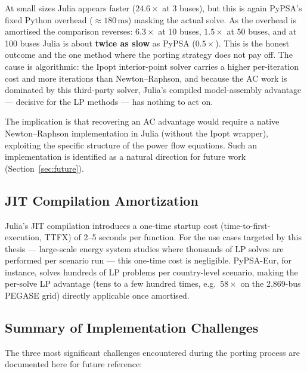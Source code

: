 At small sizes Julia appears faster ($24.6\times$ at 3 buses), but this is again PyPSA's fixed Python overhead ($\approx 180\,\text{ms}$) masking the actual solve. As the overhead is amortised the comparison reverses: $6.3\times$ at 10 buses, $1.5\times$ at 50 buses, and at 100 buses Julia is about \textbf{twice as slow} as PyPSA ($0.5\times$). This is the honest outcome and the one method where the porting strategy does not pay off. The cause is algorithmic: the Ipopt interior-point solver carries a higher per-iteration cost and more iterations than Newton--Raphson, and because the AC work is dominated by this third-party solver, Julia's compiled model-assembly advantage --- decisive for the LP methods --- has nothing to act on.

The implication is that recovering an AC advantage would require a native Newton--Raphson implementation in Julia (without the Ipopt wrapper), exploiting the specific structure of the power flow equations. Such an implementation is identified as a natural direction for future work (Section~\ref{sec:future}).

\subsection{JIT Compilation Amortization}

Julia's JIT compilation introduces a one-time startup cost (time-to-first-execution, TTFX) of 2--5 seconds per function. For the use cases targeted by this thesis --- large-scale energy system studies where thousands of LP solves are performed per scenario run --- this one-time cost is negligible. PyPSA-Eur, for instance, solves hundreds of LP problems per country-level scenario, making the per-solve LP advantage (tens to a few hundred times, e.g.\ $58\times$ on the 2{,}869-bus PEGASE grid) directly applicable once amortised.

\subsection{Summary of Implementation Challenges}

The three most significant challenges encountered during the porting process are documented here for future reference:

